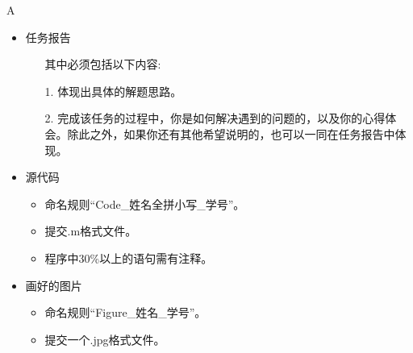 \documentclass[12pt,a4paper]{article}
\begin{document}
\begin{ACEEsubmit}{A}
\begin{itemize}
	\item 任务报告
	\begin{itemize}
		\item[] 其中必须包括以下内容:
		\item[1.] 体现出具体的解题思路。
		\item[2.] 完成该任务的过程中，你是如何解决遇到的问题的，以及你的心得体会。除此之外，如果你还有其他希望说明的，也可以一同在任务报告中体现。
	\end{itemize}
	\item 源代码
	\begin{itemize}
		\item 命名规则``Code\_姓名全拼小写\_学号''。
		\item 提交.m格式文件。
		\item 程序中30\%以上的语句需有注释。
	\end{itemize}
	\item 画好的图片
	\begin{itemize}
		\item 命名规则``Figure\_姓名\_学号''。
		\item 提交一个.jpg格式文件。
	\end{itemize}
\end{itemize}
\end{ACEEsubmit}
\newpage
\end{document}
